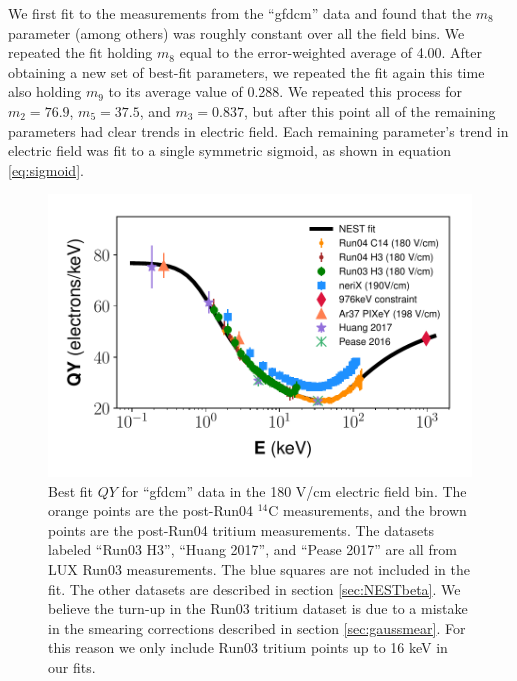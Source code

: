 We first fit to the measurements from the ``gfdcm'' data and found that the $m_8$ parameter (among others) was roughly constant over all the field bins. We repeated the fit holding $m_8$ equal to the error-weighted average of 4.00. After obtaining a new set of best-fit parameters, we repeated the fit again this time also holding $m_9$ to its average value of 0.288. We repeated this process for $m_2=76.9$, $m_5=37.5$, and $m_3=0.837$, but after this point all of the remaining parameters had clear trends in electric field. Each remaining parameter's trend in electric field was fit to a single symmetric sigmoid, as shown in equation \ref{eq:sigmoid}.
\begin{figure}[h!]
  \centering
  \includegraphics[width=\textwidth]{Figures/Yields_fit_old/NEST_fit_180Vcm_old.pdf}
  \caption{Best fit $QY$ for ``gfdcm'' data in the 180 V/cm electric field bin. The orange points are the post-Run04 $^{14}$C measurements, and the brown points are the post-Run04 tritium measurements. The datasets labeled ``Run03 H3'', ``Huang 2017'', and ``Pease 2017'' are all from LUX Run03 measurements. The blue squares are not included in the fit. The other datasets are described in section \ref{sec:NESTbeta}. We believe the turn-up in the Run03 tritium dataset is due to a mistake in the smearing corrections described in section \ref{sec:gaussmear}. For this reason we only include Run03 tritium points up to 16 keV in our fits.}
  \label{fig:gfdcm_prelim_QY180}
\end{figure}

